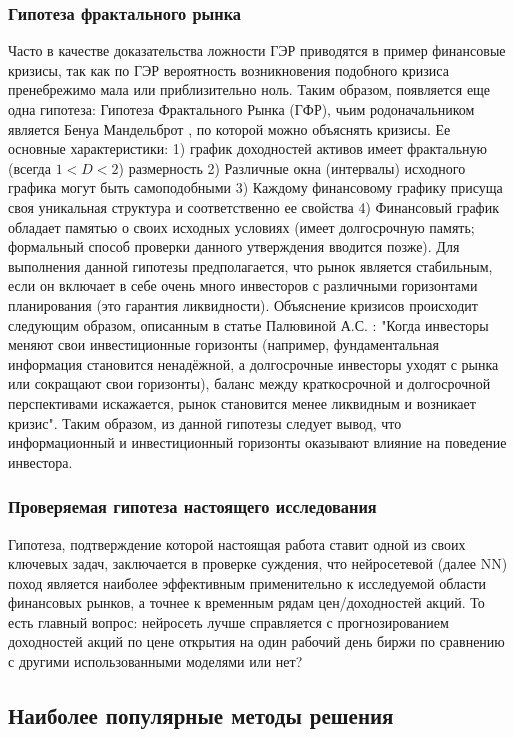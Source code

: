 		\subsubsection{Гипотеза фрактального рынка}
			Часто в качестве доказательства ложности ГЭР приводятся в пример финансовые кризисы, так как по ГЭР вероятность возникновения подобного кризиса пренебрежимо мала или приблизительно ноль. Таким образом, появляется еще одна гипотеза: Гипотеза Фрактального Рынка (ГФР), чьим родоначальником является Бенуа Мандельброт \cite{benoit_mandelbrot}, по которой можно объяснять кризисы. Ее основные характеристики: 1) график доходностей активов имеет фрактальную (всегда $1 < D <2$) размерность 2) Различные окна (интервалы) исходного графика могут быть самоподобными 3) Каждому финансовому графику присуща своя уникальная структура и соответственно ее свойства 4) Финансовый график обладает памятью о своих исходных условиях (имеет долгосрочную память; формальный способ проверки данного утверждения вводится позже). Для выполнения данной гипотезы предполагается, что рынок является стабильным, если он включает в себе очень много инвесторов с различными горизонтами планирования (это гарантия ликвидности). Объяснение кризисов происходит следующим образом, описанным в статье Палювиной А.С. \cite{fractal_market}: "Когда инвесторы меняют свои инвестиционные горизонты (например, фундаментальная информация становится ненадёжной, а	долгосрочные инвесторы уходят с рынка или сокращают свои горизонты),	баланс между краткосрочной и долгосрочной перспективами искажается,	рынок становится менее ликвидным и возникает кризис". Таким образом, из данной гипотезы следует вывод, что информационный и инвестиционный горизонты оказывают влияние на поведение инвестора.
		\subsubsection[Проверяемая гипотеза]{Проверяемая гипотеза настоящего исследования}
			Гипотеза, подтверждение которой настоящая работа ставит одной из своих ключевых задач, заключается в проверке суждения, что нейросетевой (далее NN) поход является наиболее эффективным применительно к исследуемой области финансовых рынков, а точнее к временным рядам цен/доходностей акций. То есть главный вопрос: нейросеть лучше справляется с прогнозированием доходностей акций по цене открытия на один рабочий день биржи по сравнению с другими использованными моделями или нет?
	\subsection{Наиболее популярные методы решения}
		
